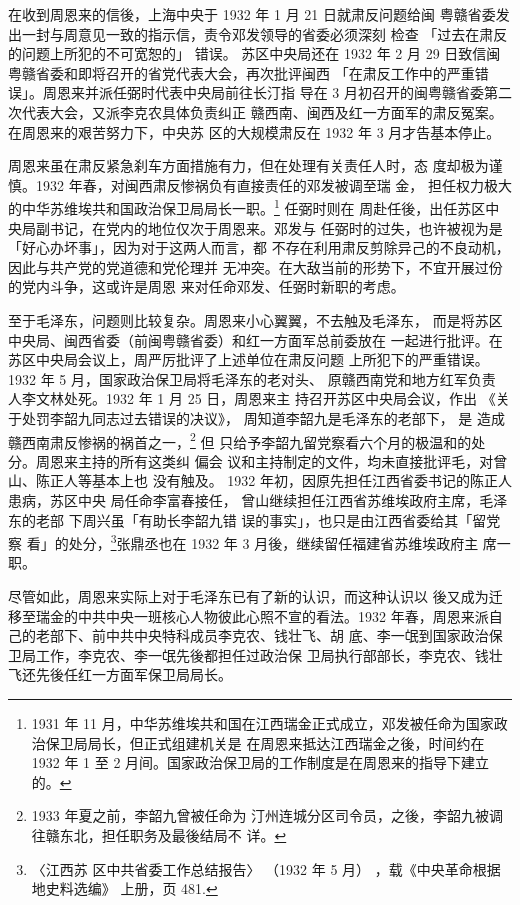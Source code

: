 在收到周恩来的信後，上海中央于 1932 年 1 月 21 日就肃反问题给闽
粤赣省委发出一封与周意见一致的指示信，责令邓发领导的省委必须深刻
检查
「过去在肃反的问题上所犯的不可宽恕的」
错误。
苏区中央局还在 1932
年 2 月 29 日致信闽粤赣省委和即将召开的省党代表大会，再次批评闽西
「在肃反工作中的严重错误」。周恩来并派任弼时代表中央局前往长汀指
导在 3 月初召开的闽粤赣省委第二次代表大会，又派李克农具体负责纠正
赣西南、闽西及红一方面军的肃反冤案。在周恩来的艰苦努力下，中央苏
区的大规模肃反在 1932 年 3 月才告基本停止。

周恩来虽在肃反紧急刹车方面措施有力，但在处理有关责任人时，态
度却极为谨慎。1932 年春，对闽西肃反惨祸负有直接责任的邓发被调至瑞
金，
担任权力极大的中华苏维埃共和国政治保卫局局长一职。\footnote{1931 年 11 月，中华苏维埃共和国在江西瑞金正式成立，邓发被任命为国家政治保卫局局长，但正式组建机关是
在周恩来抵达江西瑞金之後，时间约在 1932 年 1 至 2 月间。国家政治保卫局的工作制度是在周恩来的指导下建立的。
} 任弼时则在
周赴任後，出任苏区中央局副书记，在党内的地位仅次于周恩来。邓发与
任弼时的过失，也许被视为是「好心办坏事」，因为对于这两人而言，都
不存在利用肃反剪除异己的不良动机，因此与共产党的党道德和党伦理并
无冲突。在大敌当前的形势下，不宜开展过份的党内斗争，这或许是周恩
来对任命邓发、任弼时新职的考虑。

至于毛泽东，问题则比较复杂。周恩来小心翼翼，不去触及毛泽东， 而是将苏区
中央局、闽西省委（前闽粤赣省委）和红一方面军总前委放在 一起进行批评。在
苏区中央局会议上，周严厉批评了上述单位在肃反问题 上所犯下的严重错误。
1932 年 5 月，国家政治保卫局将毛泽东的老对头、 原赣西南党和地方红军负责
人李文林处死。1932 年 1 月 25 日，周恩来主 持召开苏区中央局会议，作出
《关于处罚李韶九同志过去错误的决议》， 周知道李韶九是毛泽东的老部下， 是
造成赣西南肃反惨祸的祸首之一，\footnote{1933 年夏之前，李韶九曾被任命为
汀州连城分区司令员，之後，李韶九被调往赣东北，担任职务及最後结局不 详。}
但 只给予李韶九留党察看六个月的极温和的处分。周恩来主持的所有这类纠 偏会
议和主持制定的文件，均未直接批评毛，对曾山、陈正人等基本上也 没有触及。
1932 年初，因原先担任江西省委书记的陈正人患病，苏区中央 局任命李富春接任，
曾山继续担任江西省苏维埃政府主席，毛泽东的老部 下周兴虽「有助长李韶九错
误的事实」，也只是由江西省委给其「留党察 看」的处分，\footnote{〈江西苏
区中共省委工作总结报告〉 （1932 年 5 月） ，载《中央革命根据地史料选编》
上册，页 481.}张鼎丞也在 1932 年 3 月後，继续留任福建省苏维埃政府主 席一
职。

尽管如此，周恩来实际上对于毛泽东已有了新的认识，而这种认识以
後又成为迁移至瑞金的中共中央一班核心人物彼此心照不宣的看法。1932
年春，周恩来派自己的老部下、前中共中央特科成员李克农、钱壮飞、胡
底、李一氓到国家政治保卫局工作，李克农、李一氓先後都担任过政治保
卫局执行部部长，李克农、钱壮飞还先後任红一方面军保卫局局长。

